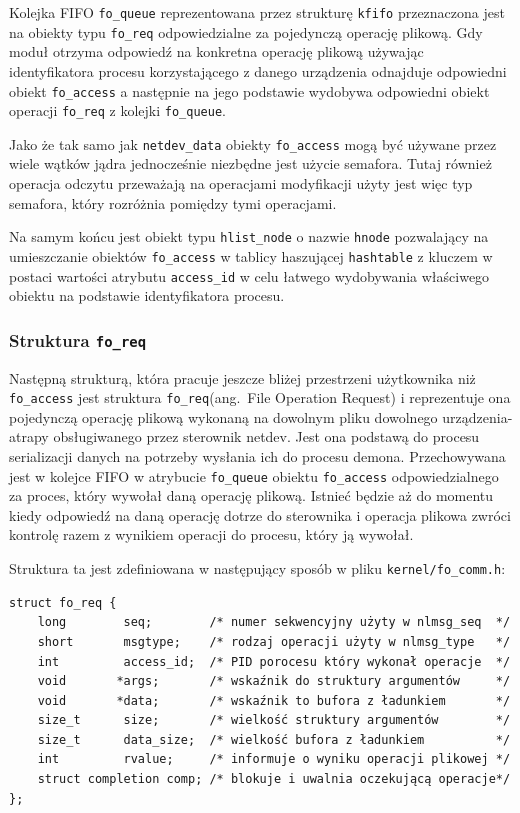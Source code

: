 \documentclass[11pt]{scrartcl}
\begin{document}
Kolejka FIFO \texttt{fo\_queue} reprezentowana przez strukturę \texttt{kfifo} przeznaczona jest na obiekty typu \texttt{fo\_req} odpowiedzialne za pojedynczą operację plikową. Gdy moduł otrzyma odpowiedź na konkretna operację plikową używając identyfikatora procesu korzystającego z danego urządzenia odnajduje odpowiedni obiekt \texttt{fo\_access} a następnie na jego podstawie wydobywa odpowiedni obiekt operacji \texttt{fo\_req} z kolejki \texttt{fo\_queue}.

Jako że tak samo jak \texttt{netdev\_data} obiekty \texttt{fo\_access} mogą być używane przez wiele wątków jądra jednocześnie niezbędne jest użycie semafora. Tutaj również operacja odczytu przeważają na operacjami modyfikacji użyty jest więc typ semafora, który rozróżnia pomiędzy tymi operacjami.

Na samym końcu jest obiekt typu \texttt{hlist\_node} o nazwie \texttt{hnode} pozwalający na umieszczanie obiektów \texttt{fo\_access} w tablicy haszującej \texttt{hashtable} z kluczem w postaci wartości atrybutu \texttt{access\_id} w celu łatwego wydobywania właściwego obiektu na podstawie identyfikatora procesu.

\subsubsection{Struktura \texttt{\large{fo\_req}}}

Następną strukturą, która pracuje jeszcze bliżej przestrzeni użytkownika niż \texttt{fo\_access} jest struktura \texttt{fo\_req}(ang.\ File Operation Request) i reprezentuje ona pojedynczą operację plikową wykonaną na dowolnym pliku dowolnego urządzenia-atrapy obsługiwanego przez sterownik netdev. Jest ona podstawą do procesu serializacji danych na potrzeby wysłania ich do procesu demona.  Przechowywana jest w kolejce FIFO w atrybucie \texttt{fo\_queue} obiektu \texttt{fo\_access} odpowiedzialnego za proces, który wywołał daną operację plikową. Istnieć będzie aż do momentu kiedy odpowiedź na daną operację dotrze do sterownika i operacja plikowa zwróci kontrolę razem z wynikiem operacji do procesu, który ją wywołał.

Struktura ta jest zdefiniowana w następujący sposób w pliku \texttt{kernel/fo\_comm.h}:

\begin{verbatim}
struct fo_req {
    long        seq;        /* numer sekwencyjny użyty w nlmsg_seq  */
    short       msgtype;    /* rodzaj operacji użyty w nlmsg_type   */
    int         access_id;  /* PID porocesu który wykonał operacje  */
    void       *args;       /* wskaźnik do struktury argumentów     */
    void       *data;       /* wskaźnik to bufora z ładunkiem       */
    size_t      size;       /* wielkość struktury argumentów        */
    size_t      data_size;  /* wielkość bufora z ładunkiem          */
    int         rvalue;     /* informuje o wyniku operacji plikowej */
    struct completion comp; /* blokuje i uwalnia oczekującą operacje*/
};
\end{verbatim}
\end{document}
